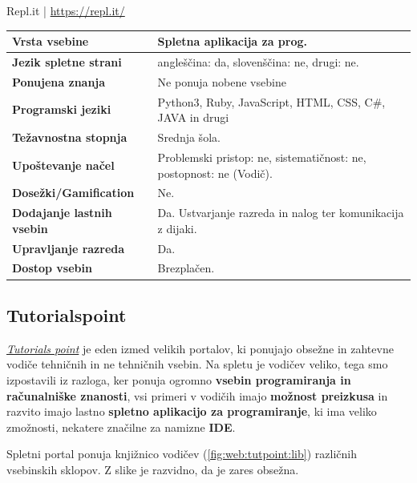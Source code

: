 \begin{osebnabox}[label={osebna:replIT}]{Repl.it | \url{https://repl.it/}}
    \begin{tabular}{
  p{} |
  p{}  }
  \textbf{Vrsta vsebine} & Spletna aplikacija za prog. \\
      \hline
  \textbf{Jezik spletne strani} & angleščina: da, slovenščina: ne,
                                  drugi: ne. \\
      \hline
  \textbf{Ponujena znanja} & Ne ponuja nobene vsebine\\
      \hline
 \textbf{Programski jeziki} & Python3,
  Ruby, JavaScript, HTML, CSS, C\#, JAVA in drugi\\
      \hline
  \textbf{Težavnostna stopnja} & Srednja šola.\\
      \hline
   \textbf{Upoštevanje načel} & Problemski pristop: ne,
                                sistematičnost: ne, postopnost: ne (Vodič). \\
      \hline
  \textbf{Dosežki/Gamification} & Ne. \\
      \hline
  \textbf{Dodajanje lastnih vsebin} & Da. Ustvarjanje razreda in nalog
                                      ter komunikacija z dijaki. \\
      \hline
  \textbf{Upravljanje razreda} & Da. \\
      \hline
  \textbf{Dostop vsebin} & Brezplačen. \\

\end{tabular}
\end{osebnabox}

\subsection{Tutorialspoint}
\label{sec:tutorials_point}

\emph{\href{http://www.tutorialspoint.com/}{Tutorials point}}
\cite{web:tutorialspoint} je eden izmed velikih portalov, ki ponujajo
obsežne in zahtevne vodiče tehničnih in ne tehničnih vsebin. Na
spletu je vodičev veliko, tega smo izpostavili iz razloga, ker ponuja
ogromno \textbf{vsebin programiranja in računalniške znanosti}, vsi
primeri v vodičih imajo \textbf{možnost preizkusa} in razvito imajo
lastno \textbf{spletno aplikacijo za programiranje}, ki ima veliko
zmožnosti, nekatere značilne za namizne \textbf{IDE}.

Spletni portal ponuja knjižnico vodičev (\ref{fig:web:tutpoint:lib})
različnih vsebinskih sklopov. Z slike je razvidno, da je zares
obsežna.


